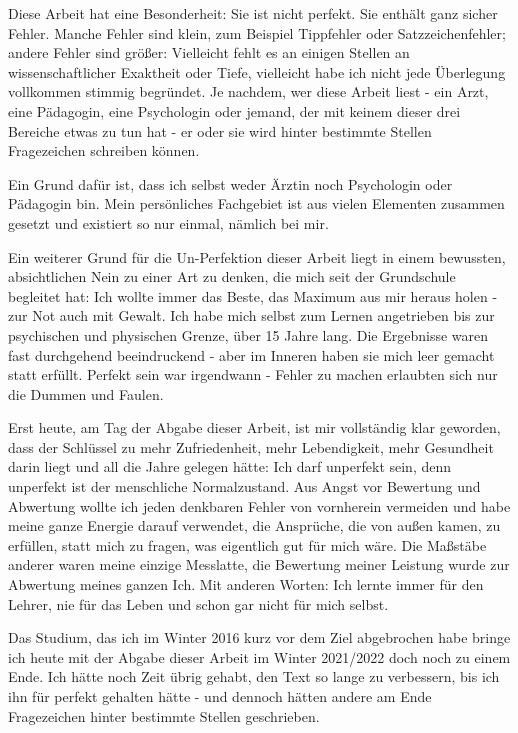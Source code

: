\documentclass[
  twoside,
  parskip=half-,
  paper=176mm:246mm,
  BCOR=14mm,
  DIV=14,
]{scrreprt}
\begin{document}
Diese Arbeit hat eine Besonderheit: Sie ist nicht perfekt. Sie enthält ganz sicher Fehler. Manche Fehler sind klein, zum Beispiel Tippfehler oder Satzzeichenfehler; andere Fehler sind größer: Vielleicht fehlt es an einigen Stellen an wissenschaftlicher Exaktheit oder Tiefe, vielleicht habe ich nicht jede Überlegung vollkommen stimmig begründet. Je nachdem, wer diese Arbeit liest - ein Arzt, eine Pädagogin, eine Psychologin oder jemand, der mit keinem dieser drei Bereiche etwas zu tun hat - er oder sie wird hinter bestimmte Stellen Fragezeichen schreiben können. 

Ein Grund dafür ist, dass ich selbst weder Ärztin noch Psychologin oder Pädagogin bin. Mein persönliches Fachgebiet ist aus vielen Elementen zusammen gesetzt und existiert so nur einmal, nämlich bei mir. 

Ein weiterer Grund für die Un-Perfektion dieser Arbeit liegt in einem bewussten, absichtlichen Nein zu einer Art zu denken, die mich seit der Grundschule begleitet hat: Ich wollte immer das Beste, das Maximum aus mir heraus holen - zur Not auch mit Gewalt. Ich habe mich selbst zum Lernen angetrieben bis zur psychischen und physischen Grenze, über 15 Jahre lang. Die Ergebnisse waren fast durchgehend beeindruckend - aber im Inneren haben sie mich leer gemacht statt erfüllt. Perfekt sein war irgendwann  - Fehler zu machen erlaubten sich nur die Dummen und Faulen. 

Erst heute, am Tag der Abgabe dieser Arbeit, ist mir vollständig klar geworden, dass der Schlüssel zu mehr Zufriedenheit, mehr Lebendigkeit, mehr Gesundheit darin liegt und all die Jahre gelegen hätte: Ich darf unperfekt sein, denn unperfekt ist der menschliche Normalzustand. Aus Angst vor Bewertung und Abwertung wollte ich jeden denkbaren Fehler von vornherein vermeiden und habe meine ganze Energie darauf verwendet, die Ansprüche, die von außen kamen, zu erfüllen, statt mich zu fragen, was eigentlich gut für mich wäre. Die Maßstäbe anderer waren meine einzige Messlatte, die Bewertung meiner Leistung wurde zur Abwertung meines ganzen Ich.
Mit anderen Worten: Ich lernte immer für den Lehrer, nie für das Leben und schon gar nicht für mich selbst. 

Das Studium, das ich im Winter 2016 kurz vor dem Ziel abgebrochen habe bringe ich heute mit der Abgabe dieser Arbeit im Winter 2021/2022 doch noch zu einem Ende. Ich hätte noch Zeit übrig gehabt, den Text so lange zu verbessern, bis ich ihn für perfekt gehalten hätte - und dennoch hätten andere am Ende Fragezeichen hinter bestimmte Stellen geschrieben. 
\end{document}

